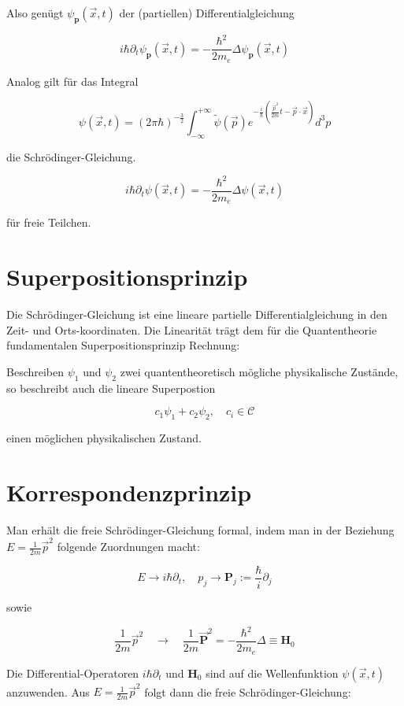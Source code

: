 \documentclass[10pt, letterpaper]{article}
\begin{document}
Also genügt $\psi_{\mathbf{p}}(\vec{x}, t)$ der (partiellen) Differentialgleichung

$$
i \hbar \partial_{t} \psi_{\mathbf{p}}(\vec{x}, t)=-\frac{\hbar^{2}}{2 m_{e}} \Delta \psi_{\mathbf{p}}(\vec{x}, t)
$$

Analog gilt für das Integral

$$
\psi(\vec{x}, t)=(2 \pi \hbar)^{-\frac{3}{2}} \int_{-\infty}^{+\infty} \widetilde{\psi}(\vec{p}) e^{-\frac{i}{\hbar}\left(\frac{\vec{p}^{2}}{2 m} t-\vec{p} \cdot \vec{x}\right)} d^{3} p
$$

die Schrödinger-Gleichung.


$$
i \hbar \partial_{t} \psi(\vec{x}, t)=-\frac{\hbar^{2}}{2 m_{e}} \Delta \psi(\vec{x}, t)
$$

für freie Teilchen.

\section*{Superpositionsprinzip}
Die Schrödinger-Gleichung ist eine lineare partielle Differentialgleichung in den Zeit- und Orts-koordinaten. Die Linearität trägt dem für die Quantentheorie fundamentalen Superpositionsprinzip Rechnung:

Beschreiben $\psi_{1}$ und $\psi_{2}$ zwei quantentheoretisch mögliche physikalische Zustände, so beschreibt auch die lineare Superpostion

$$
c_{1} \psi_{1}+c_{2} \psi_{2}, \quad c_{i} \in \mathcal{C}
$$

einen möglichen physikalischen Zustand.
\section*{Korrespondenzprinzip}
Man erhält die freie Schrödinger-Gleichung formal, indem man in der Beziehung $E=\frac{1}{2 m} \vec{p}^{2}$ folgende Zuordnungen macht:

$$
E \rightarrow i \hbar \partial_{t}, \quad p_{j} \rightarrow \mathbf{P}_{j}:=\frac{\hbar}{i} \partial_{j}
$$

sowie

$$
\frac{1}{2 m} \vec{p}^{2} \quad \rightarrow \quad \frac{1}{2 m} \overrightarrow{\mathbf{P}}^{2}=-\frac{\hbar^{2}}{2 m_{e}} \Delta \equiv \mathbf{H}_{0}
$$

Die Differential-Operatoren $i \hbar \partial_{t}$ und $\mathbf{H}_{0}$ sind auf die Wellenfunktion $\psi(\vec{x}, t)$ anzuwenden. Aus $E=\frac{1}{2 m} \vec{p}^{2}$ folgt dann die freie Schrödinger-Gleichung:
\end{document}
